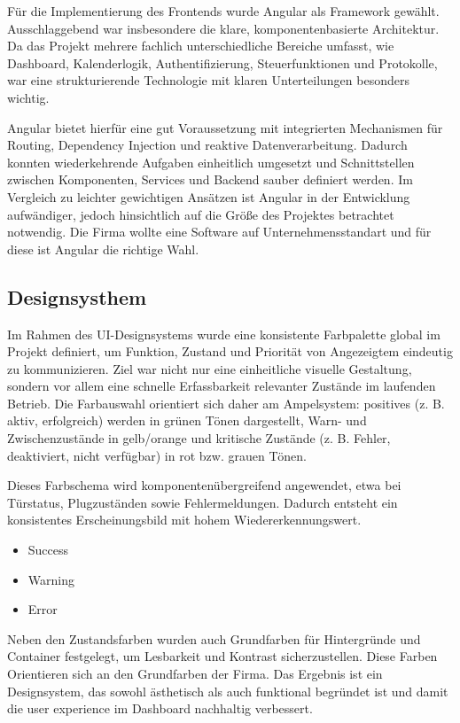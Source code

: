 Für die Implementierung des Frontends wurde Angular als Framework gewählt. Ausschlaggebend war insbesondere die klare, komponentenbasierte Architektur. Da das Projekt mehrere fachlich unterschiedliche Bereiche umfasst, wie Dashboard, Kalenderlogik, Authentifizierung, Steuerfunktionen und Protokolle, war eine strukturierende Technologie mit klaren Unterteilungen besonders wichtig.

Angular bietet hierfür eine gut Voraussetzung mit integrierten Mechanismen für Routing, Dependency Injection und reaktive Datenverarbeitung. Dadurch konnten wiederkehrende Aufgaben einheitlich umgesetzt und Schnittstellen zwischen Komponenten, Services und Backend sauber definiert werden. Im Vergleich zu leichter gewichtigen Ansätzen ist Angular in der Entwicklung aufwändiger, jedoch hinsichtlich auf die Größe des Projektes betrachtet notwendig. Die Firma wollte eine Software auf Unternehmensstandart und für diese ist Angular die richtige Wahl.

\subsection{Designsysthem}
Im Rahmen des UI-Designsystems wurde eine konsistente Farbpalette global im Projekt definiert, um Funktion, Zustand und Priorität von Angezeigtem eindeutig zu kommunizieren. Ziel war nicht nur eine einheitliche visuelle Gestaltung, sondern vor allem eine schnelle Erfassbarkeit relevanter Zustände im laufenden Betrieb. Die Farbauswahl orientiert sich daher am Ampelsystem: positives (z. B. aktiv, erfolgreich) werden in grünen Tönen dargestellt, Warn- und Zwischenzustände in gelb/orange und kritische Zustände (z. B. Fehler, deaktiviert, nicht verfügbar) in rot bzw. grauen Tönen.

Dieses Farbschema wird komponentenübergreifend angewendet, etwa bei Türstatus, Plugzuständen sowie Fehlermeldungen. Dadurch entsteht ein konsistentes Erscheinungsbild mit hohem Wiedererkennungswert. 


\begin{itemize}
\item \textcolor{tmp1}{Success}
\item \textcolor{tmp2}{Warning}
\item \textcolor{tmp3}{Error}
\end{itemize}

Neben den Zustandsfarben wurden auch Grundfarben für Hintergründe und Container festgelegt, um Lesbarkeit und Kontrast sicherzustellen. Diese Farben Orientieren sich an den Grundfarben der Firma. Das Ergebnis ist ein Designsystem, das sowohl ästhetisch als auch funktional begründet ist und damit die user experience im Dashboard nachhaltig verbessert.

